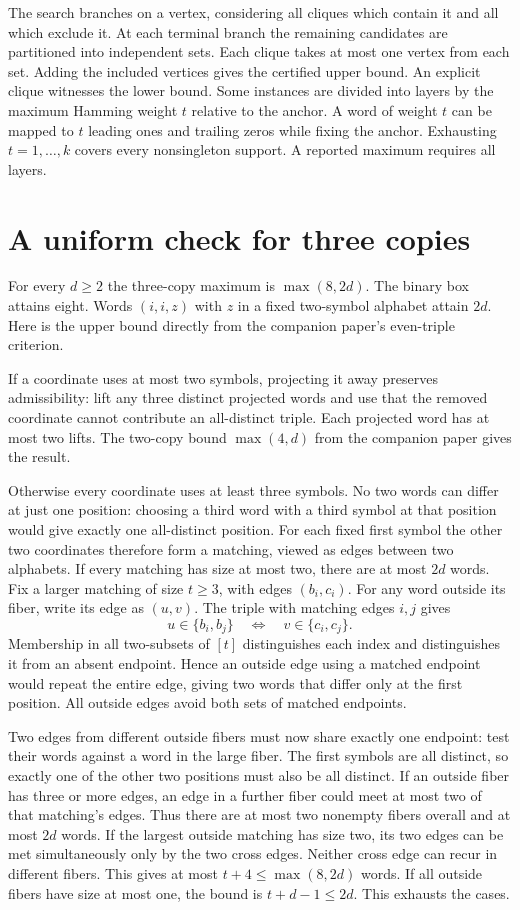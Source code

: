 \documentclass[11pt]{article}
\begin{document}
The search branches on a vertex, considering all cliques which contain it and all which exclude it. At each terminal branch the remaining candidates are partitioned into independent sets. Each clique takes at most one vertex from each set. Adding the included vertices gives the certified upper bound. An explicit clique witnesses the lower bound. Some instances are divided into layers by the maximum Hamming weight $t$ relative to the anchor. A word of weight $t$ can be mapped to $t$ leading ones and trailing zeros while fixing the anchor. Exhausting $t=1,\ldots,k$ covers every nonsingleton support. A reported maximum requires all layers.


\section*{A uniform check for three copies}
For every $d\ge2$ the three-copy maximum is $\max(8,2d)$.
The binary box attains eight. Words $(i,i,z)$ with $z$ in a fixed
two-symbol alphabet attain $2d$. Here is the upper bound directly from
the companion paper's even-triple criterion.

If a coordinate uses at most two symbols, projecting it away preserves
admissibility: lift any three distinct projected words and use that the
removed coordinate cannot contribute an all-distinct triple. Each
projected word has at most two lifts. The two-copy bound $\max(4,d)$
from the companion paper gives the result.

Otherwise every coordinate uses at least three symbols. No two words can
differ at just one position: choosing a third word with a third symbol at
that position would give exactly one all-distinct position. For each
fixed first symbol the other two coordinates therefore form a matching,
viewed as edges between two alphabets. If every matching has size at most
two, there are at most $2d$ words. Fix a larger matching of size $t\ge3$,
with edges $(b_i,c_i)$. For any word outside its fiber, write its edge
as $(u,v)$. The triple with matching edges $i,j$ gives
\[
 u\in\{b_i,b_j\}\quad\Longleftrightarrow\quad v\in\{c_i,c_j\}.
\]
Membership in all two-subsets of $[t]$ distinguishes each index and
distinguishes it from an absent endpoint. Hence an outside edge using a
matched endpoint would repeat the entire edge, giving two words that
differ only at the first position. All outside edges avoid both sets of
matched endpoints.

Two edges from different outside fibers must now share exactly one
endpoint: test their words against a word in the large fiber. The first
symbols are all distinct, so exactly one of the other two positions must
also be all distinct. If an outside fiber has three or more edges, an
edge in a further fiber could meet at most two of that matching's edges.
Thus there are at most two nonempty fibers overall and at most $2d$ words.
If the largest outside matching has size two, its two edges can be met
simultaneously only by the two cross edges. Neither cross edge can recur
in different fibers. This gives at most $t+4\le\max(8,2d)$ words. If
all outside fibers have size at most one, the bound is $t+d-1\le2d$.
This exhausts the cases.
\end{document}
